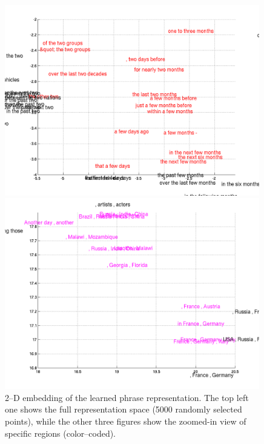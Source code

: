 \begin{figure}[ht]
\begin{minipage}{0.48\textwidth}
        \includegraphics[width=0.99\textwidth]{figures/phrase_zoom2.png}
    \end{minipage}
    \hfill
    \begin{minipage}{0.48\textwidth}
        \centering
        \includegraphics[width=0.99\textwidth]{figures/phrase_zoom3.png}
    \end{minipage}
    \caption{2--D embedding of the learned phrase representation. The top left
    one shows the full representation space (5000 randomly selected points),
while the other three figures show the zoomed-in view of specific regions
(color--coded).} 
    \label{fig:phrase_embed}
    \vspace{-3mm}
\end{figure}

